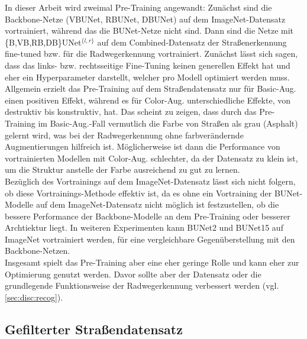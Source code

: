 In dieser Arbeit wird zweimal Pre-Training angewandt: Zunächst sind die Backbone-Netze (VBUNet, RBUNet, DBUNet) 
auf dem ImageNet-Datensatz vortrainiert, während das die BUNet-Netze nicht sind. Dann sind die Netze 
mit \{B,VB,RB,DB\}UNet$^{\{l,r\}}$ auf dem Combined-Datensatz der Straßenerkennung fine-tuned bzw. für die 
Radwegerkennung vortrainiert. Zunächst lässt sich sagen, dass das links- bzw. rechtsseitige Fine-Tuning 
keinen generellen Effekt hat und eher ein Hyperparameter darstellt, welcher pro Modell optimiert werden muss. 
Allgemein erzielt das Pre-Training auf dem Straßendatensatz nur für Basic-Aug. einen positiven Effekt, 
während es für Color-Aug. unterschiedliche Effekte, von destruktiv bis konstruktiv, hat. 
Das scheint zu zeigen, dass durch das Pre-Training im Basic-Aug.-Fall vermutlich die Farbe von Straßen als 
grau (Asphalt) gelernt wird, was bei der Radwegerkennung ohne farbverändernde Augmentierungen hilfreich ist.  
Möglicherweise ist dann die Performance von vortrainierten Modellen mit Color-Aug. schlechter, 
da der Datensatz zu klein ist, um die Struktur anstelle der Farbe ausreichend zu gut zu lernen. \\ 
Bezüglich des Vortrainings auf dem ImageNet-Datensatz lässt sich nicht folgern, 
ob diese Vortrainings-Methode effektiv ist, da es ohne ein Vortraining der BUNet-Modelle auf dem ImageNet-Datensatz 
nicht möglich ist festzustellen, ob die bessere Performance der Backbone-Modelle an dem Pre-Training oder 
besserer Archtiektur liegt. In weiteren Experimenten kann BUNet2 und BUNet15 auf ImageNet vortrainiert werden, 
für eine vergleichbare Gegenüberstellung mit den Backbone-Netzen. \\
Insgesamt spielt das Pre-Training aber eine eher geringe Rolle und kann eher zur Optimierung genutzt werden. 
Davor sollte aber der Datensatz oder die grundlegende Funktionsweise der Radwegerkennung verbessert werden (vgl. \autoref{sec:disc:recog}). 

\subsection{Gefilterter Straßendatensatz}

\newcommand{\overbar}[1]{\mkern 8mu\overline{\mkern-8mu#1\mkern-8mu}\mkern 8mu}

